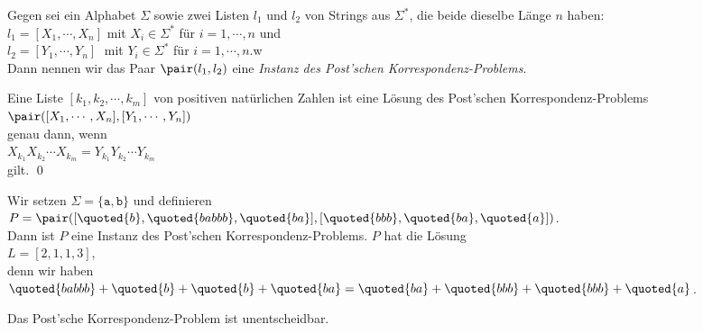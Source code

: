 \begin{Definition}
Gegen sei ein Alphabet $\Sigma$ sowie zwei Listen $l_1$ und $l_2$ von Strings aus
$\Sigma^*$, die beide dieselbe L\"ange $n$ haben:
\\[0.2cm]
\hspace*{1.3cm}
$l_1 = [X_1, \cdots, X_n]$ \quad mit $X_i \in \Sigma^*$ f\"ur $i=1,\cdots,n$ \quad und
\\[0.2cm]
\hspace*{1.3cm}
$l_2 = [Y_1, \cdots, Y_n]\;$ \quad mit $Y_i \in \Sigma^*$ f\"ur $i=1,\cdots,n$.w
\\[0.2cm]
Dann nennen wir das Paar $\pair(l_1, l_2)$ eine \emph{Instanz des Post'schen Korrespondenz-Problems}.
\vspace*{0.2cm}

\noindent  
Eine Liste $[k_1, k_2, \cdots, k_m]$ von positiven nat\"urlichen Zahlen ist eine L\"osung des Post'schen Korrespondenz-Problems
\\[0.2cm]
\hspace*{1.3cm}
$\pair([X_1, \cdots, X_n], [Y_1, \cdots, Y_n])$
\\[0.2cm]
genau dann, wenn
\\[0.2cm]
\hspace*{1.3cm}
$X_{k_1} X_{k_2} \cdots X_{k_m} = Y_{k_1} Y_{k_2} \cdots Y_{k_m}$ 
\\[0.2cm]
gilt.  \qed
\end{Definition}

\example
Wir setzen $\Sigma = \{ \mathtt{a}, \mathtt{b}\}$ und definieren
\\[0.2cm]
\hspace*{1.3cm}
$P = \pair([\quoted{b}, \quoted{babbb}, \quoted{ba} ], [\quoted{bbb}, \quoted{ba}, \quoted{a}])$.
\\[0.2cm]
Dann ist $P$ eine Instanz des Post'schen Korrespondenz-Problems.   $P$ hat
die  L\"osung
\\[0.2cm]
\hspace*{1.3cm}
$L = [2,1,1,3]$,
\\[0.2cm]
denn wir haben
\\[0.2cm]
\hspace*{1.3cm}
$\quoted{babbb} + \quoted{b} + \quoted{b} + \quoted{ba} = 
 \quoted{ba} + \quoted{bbb} + \quoted{bbb} + \quoted{a}$.


\begin{Satz}
  Das Post'sche Korrespondenz-Problem ist unentscheidbar.
\end{Satz}

